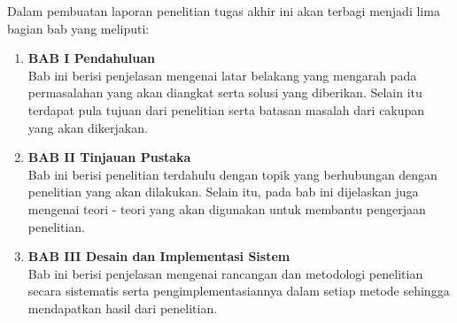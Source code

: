 Dalam pembuatan laporan penelitian tugas akhir ini akan terbagi menjadi lima bagian bab yang meliputi:

\begin{enumerate}[nolistsep]

  \item \textbf{BAB I Pendahuluan} \\     
      Bab ini berisi penjelasan mengenai latar belakang yang mengarah pada permasalahan yang akan diangkat serta solusi yang diberikan. Selain itu terdapat pula tujuan dari penelitian serta batasan masalah dari cakupan yang akan dikerjakan.
        \vspace{2ex}

  \item \textbf{BAB II Tinjauan Pustaka} \\
      Bab ini berisi penelitian terdahulu dengan topik yang berhubungan dengan penelitian yang akan dilakukan. Selain itu, pada bab ini dijelaskan juga mengenai teori - teori yang akan digunakan untuk membantu pengerjaan penelitian.

        \vspace{2ex}

  \item \textbf{BAB III Desain dan Implementasi Sistem} \\
      Bab ini berisi penjelasan mengenai rancangan dan metodologi penelitian secara sistematis serta pengimplementasiannya dalam setiap metode sehingga mendapatkan hasil dari penelitian.

        \vspace{2ex}




\end{enumerate}
